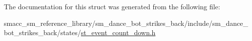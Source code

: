 The documentation for this struct was generated from the following file\+:\begin{DoxyCompactItemize}
\item 
smacc\+\_\+sm\+\_\+reference\+\_\+library/sm\+\_\+dance\+\_\+bot\+\_\+strikes\+\_\+back/include/sm\+\_\+dance\+\_\+bot\+\_\+strikes\+\_\+back/states/\hyperlink{sm__dance__bot__strikes__back_2include_2sm__dance__bot__strikes__back_2states_2st__event__count__down_8h}{st\+\_\+event\+\_\+count\+\_\+down.\+h}\end{DoxyCompactItemize}
